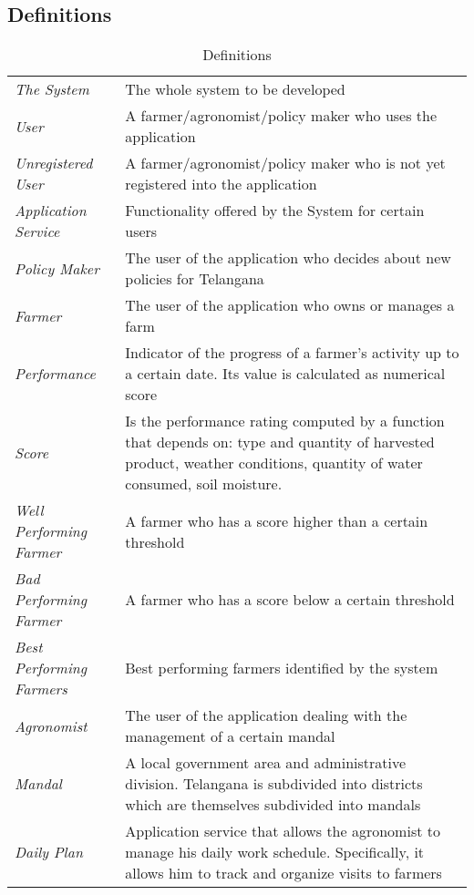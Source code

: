 \subsection{Definitions}
\begin{center}
\setlength\tabcolsep{7pt}
\renewcommand{\arraystretch}{2}
\begin{longtable}{|m{3.2cm}|m{8.3cm}|}
\caption{Definitions}\\
\hline
\endfirsthead
\endhead
\hline
\endlastfoot
\hline
\textit{The System} & The whole system to be developed \\
\textit{User} & A farmer/agronomist/policy maker who uses the application\\
\textit{Unregistered User} & A farmer/agronomist/policy maker who is not yet registered into the application\\
\textit{Application Service} & Functionality offered by the 
System for certain users \\
\textit{Policy Maker} & The user of the application who decides about new policies for Telangana \\
\textit{Farmer} & The user of the application who owns or manages a farm\\
\textit{Performance} & Indicator of the progress of a farmer's activity up to a certain date. Its value is calculated as numerical score \\
\textit{Score} & Is the performance rating computed by a function that depends on: type and quantity of harvested product, weather conditions, quantity of water consumed, soil moisture.\\
\textit{Well Performing Farmer} & A farmer who has a score higher than a certain threshold\\
\textit{Bad Performing Farmer} & A farmer who has a score below a certain threshold\\
\textit{Best Performing Farmers} & Best performing farmers identified by the system\\
\textit{Agronomist} & The user of the application dealing with the management of a certain mandal\\
\textit{Mandal} & A local government area and  administrative division. Telangana is subdivided into districts which are themselves subdivided into mandals\\
\textit{Daily Plan} & Application service that allows the agronomist to manage his daily work schedule. Specifically, it allows him to track and organize visits to farmers\\

\end{longtable}
\end{center}
